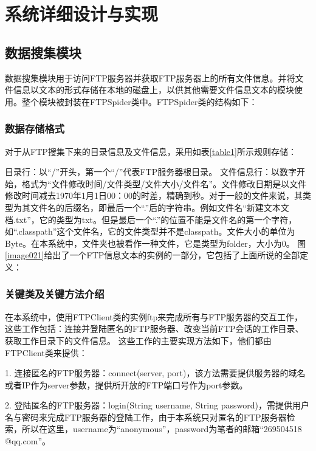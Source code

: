
\chapter{系统详细设计与实现}

\section{数据搜集模块}
数据搜集模块用于访问FTP服务器并获取FTP服务器上的所有文件信息。并将文件信息以文本的形式存储在本地的磁盘上，以供其他需要文件信息文本的模块使用。整个模块被封装在FTPSpider类中。FTPSpider类的结构如下：



\subsection{数据存储格式}
对于从FTP搜集下来的目录信息及文件信息，采用如表\ref{table1}所示规则存储：


目录行：以“/”开头，第一个“/”代表FTP服务器根目录。
文件信息行：以数字开始，格式为“文件修改时间/文件类型/文件大小/文件名”。文件修改日期是以文件修改时间减去1970年1月1日00：00的时差，精确到秒。对于一般的文件来说，其类型为其文件名的后缀名，即最后一个“.”后的字符串。例如文件名“新建文本文档.txt”，它的类型为txt。但是最后一个“.”的位置不能是文件名的第一个字符，如“.classpath”这个文件名，它的文件类型并不是classpath。文件大小的单位为Byte。在本系统中，文件夹也被看作一种文件，它是类型为folder，大小为0。
图\ref{image021}给出了一个FTP信息文本的实例的一部分，它包括了上面所说的全部定义：
\newpage
{}

\subsection{关键类及关键方法介绍}
在本系统中，使用FTPClient类的实例ftp来完成所有与FTP服务器的交互工作，这些工作包括：连接并登陆匿名的FTP服务器、改变当前FTP会话的工作目录、获取工作目录下的文件信息。
这些工作的主要实现方法如下，他们都由FTPClient类来提供：

1. 连接匿名的FTP服务器：connect(server, port)，该方法需要提供服务器的域名或者IP作为server参数，提供所开放的FTP端口号作为port参数。

2. 登陆匿名的FTP服务器：login(String username, String password)，需提供用户名与密码来完成FTP服务器的登陆工作，由于本系统只对匿名的FTP服务器检索，所以在这里，username为“anonymous”，password为笔者的邮箱“269504518\\@qq.com”。


